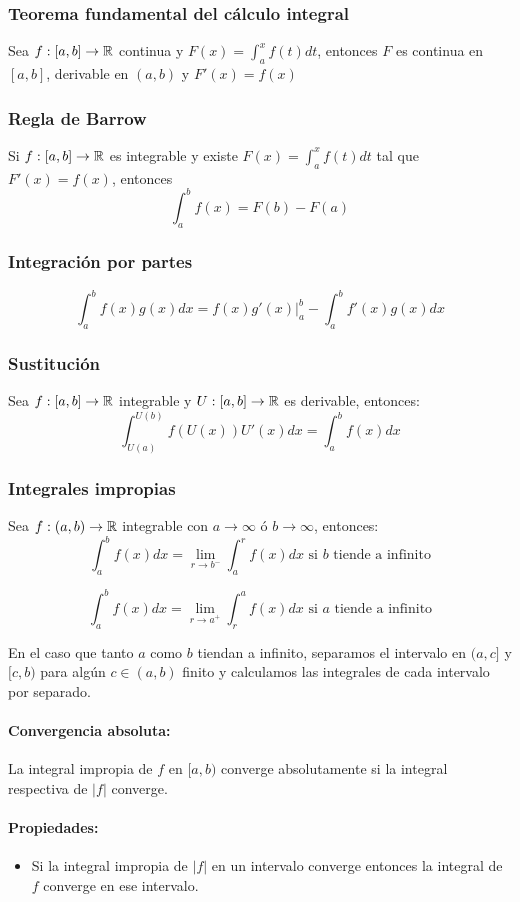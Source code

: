 \subsubsection{Teorema fundamental del cálculo integral}
Sea $f:[a,b]\to\mathbb{R}$ continua y $F(x) = \int_a^x f(t)dt$, entonces $F$ es continua en $[a,b]$, derivable en $(a,b)$ y $F'(x) = f(x)$

\subsubsection{Regla de Barrow}
Si $f:[a,b]\to\mathbb{R}$ es integrable y existe $F(x) = \int_a^x f(t)dt$ tal que $F'(x) = f(x)$, entonces $$\int_a^b f(x) = F(b) - F(a)$$

\subsubsection{Integración por partes}
$$\int_a^b f(x)g(x)dx = f(x)g'(x)\Big|_a^b - \int_a^b f'(x)g(x)dx$$

\subsubsection{Sustitución}
Sea $f:[a,b]\to\mathbb{R}$ integrable y $U:[a,b]\to\mathbb{R}$ es derivable, entonces:
$$\int_{U(a)}^{U(b)} f(U(x))U'(x)dx = \int_a^b f(x)dx$$

\subsubsection{Integrales impropias}
Sea $f:(a,b)\to\mathbb{R}$ integrable con $a\to\infty$ ó $b\to\infty$, entonces:
$$\int_a^b f(x)dx = \lim_{r\to b^{-}}\int_a^r f(x)dx \text{ si $b$ tiende a infinito}$$

$$\int_a^b f(x)dx = \lim_{r\to a^{+}}\int_r^a f(x)dx \text{ si $a$ tiende a infinito}$$

En el caso que tanto $a$ como $b$ tiendan a infinito, separamos el intervalo en $(a,c]$ y $[c,b)$ para algún $c\in(a,b)$ finito y calculamos las integrales de cada intervalo por separado.

\paragraph{Convergencia absoluta: } La integral impropia de $f$ en $[a,b)$ converge absolutamente si la integral respectiva de $|f|$ converge.
\paragraph{Propiedades:}
\begin{itemize}
    \item Si la integral impropia de $|f|$ en un intervalo converge entonces la integral de $f$ converge en ese intervalo.
\end{itemize}

